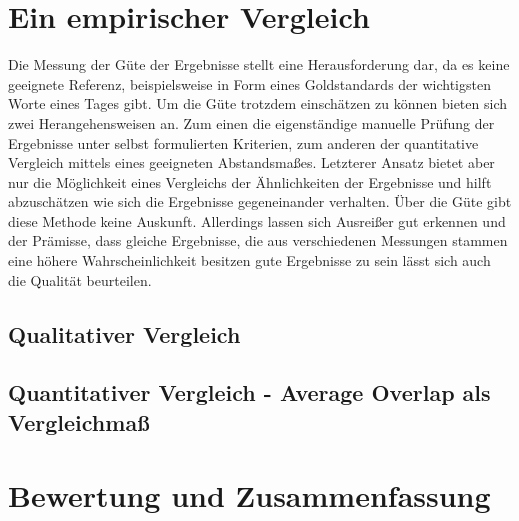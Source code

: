  








\chapter{Ein empirischer Vergleich}

Die Messung der Güte der Ergebnisse stellt eine Herausforderung dar, da es keine geeignete Referenz, beispielsweise in Form eines Goldstandards der wichtigsten Worte eines Tages gibt. Um die Güte trotzdem einschätzen zu können bieten sich zwei Herangehensweisen an. Zum einen die eigenständige manuelle Prüfung der Ergebnisse unter selbst formulierten Kriterien, zum anderen der quantitative Vergleich mittels eines geeigneten Abstandsmaßes. Letzterer Ansatz bietet aber nur die Möglichkeit eines Vergleichs der Ähnlichkeiten der Ergebnisse und hilft abzuschätzen wie sich die Ergebnisse gegeneinander verhalten. Über die Güte gibt diese Methode keine Auskunft. Allerdings lassen sich Ausreißer gut erkennen und der Prämisse, dass gleiche Ergebnisse, die aus verschiedenen Messungen stammen eine höhere Wahrscheinlichkeit besitzen gute Ergebnisse zu sein lässt sich auch die Qualität beurteilen.
\section{Qualitativer Vergleich}



\section{Quantitativer Vergleich - Average Overlap als Vergleichma\ss}




\chapter{Bewertung und Zusammenfassung}



\nocite{*}%
 


